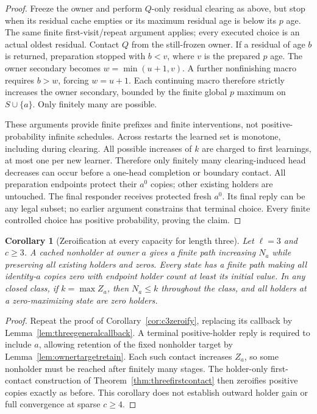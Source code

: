 \documentclass[11pt]{article}
\newtheorem{corollary}[theorem]{Corollary}
\begin{document}
\begin{proof}
Freeze the owner and perform $Q$-only residual clearing as above,
but stop when its residual cache empties or its maximum residual
age is below its $p$ age. The same finite first-visit/repeat
argument applies; every executed choice is an actual oldest
residual. Contact $Q$ from the still-frozen owner. If a residual
of age $b$ is returned, preparation stopped with $b<v$, where
$v$ is the prepared $p$ age. The owner secondary becomes
$w=\min(u+1,v)$. A further nonfinishing macro requires $b>w$,
forcing $w=u+1$. Each continuing macro therefore strictly
increases the owner secondary, bounded by the finite global
$p$ maximum on $S\cup\{a\}$. Only finitely many are possible.

These arguments provide finite prefixes and finite interventions,
not positive-probability infinite schedules. Across restarts the
learned set is monotone, including during clearing. All possible
increases of $k$ are charged to first learnings, at most one per
new learner. Therefore only finitely many clearing-induced head
decreases can occur before a one-head completion or boundary
contact. All preparation endpoints protect their $a^0$ copies;
other existing holders are untouched. The final responder receives
protected fresh $a^0$. Its final reply can be any legal subset;
no earlier argument constrains that terminal choice. Every finite
controlled choice has positive probability, proving the claim.
\end{proof}

\begin{corollary}[Zeroification at every capacity for length three]
\label{cor:threegeneralzeroify}
Let $\ell=3$ and $c\ge3$. A cached nonholder at owner $a$
gives a finite path increasing $N_a$ while preserving all
existing holders and zeros. Every state has a finite path
making all identity-$a$ copies zero with endpoint holder count
at least its initial value. In any closed class, if $k=\max Z_a$,
then $N_a\le k$ throughout the class, and all holders at a
zero-maximizing state are zero holders.
\end{corollary}
\begin{proof}
Repeat the proof of Corollary~\ref{cor:c3zeroify}, replacing
its callback by Lemma~\ref{lem:threegeneralcallback}. A terminal
positive-holder reply is required to include $a$, allowing
retention of the fixed nonholder target by
Lemma~\ref{lem:ownertargetretain}. Each such contact increases
$Z_a$, so some nonholder must be reached after finitely many
stages. The holder-only first-contact construction of
Theorem~\ref{thm:threefirstcontact} then zeroifies positive
copies exactly as before. This corollary does not establish
outward holder gain or full convergence at sparse $c\ge4$.
\end{proof}
\end{document}
